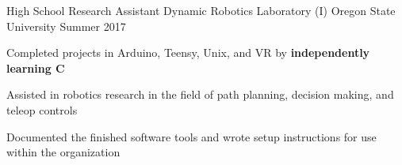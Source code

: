 \begin{cventries}

  \cventry
    {High School Research Assistant} %
    {Dynamic Robotics Laboratory (I)} %
    {Oregon State University} %
    {Summer 2017} %
    {
      \begin{cvitems} %
        \item {Completed projects in Arduino, Teensy, Unix, and VR by \textbf{independently learning C} }
        \item {Assisted in robotics research in the field of path planning, decision making, and teleop controls}
        \item {Documented the finished software tools and wrote setup instructions for use within the organization}
      \end{cvitems}
    }




\end{cventries}
